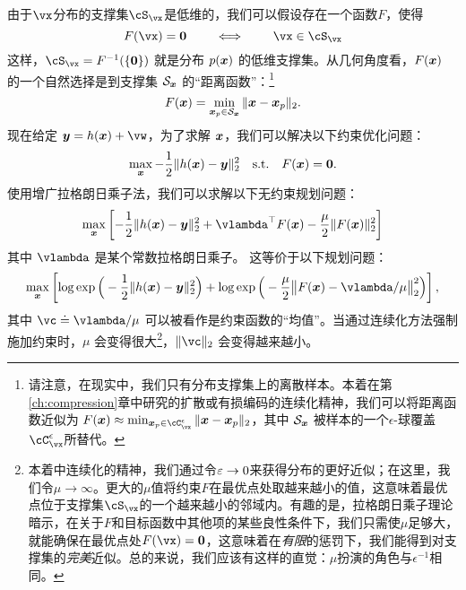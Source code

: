 \documentclass[../../book-main.tex]{subfiles}
\begin{document}
由于\(\vx\)分布的支撑集\(\cS_{\vx}\)是低维的，我们可以假设存在一个函数\(F\)，使得
\begin{equation}
  F(\vx) = \boldsymbol{0} \qquad \iff \qquad \vx \in \cS_{\vx}
\end{equation}
这样，\(\cS_{\vx} = F^{-1}(\{\vzero\})\) 就是分布 $p(\bm{x})$ 的低维支撑集。从几何角度看，$F(\bm{x})$ 的一个自然选择是到支撑集 $\mathcal{S}_{\bm{x}}$ 的“距离函数”：\footnote{请注意，在现实中，我们只有分布支撑集上的离散样本。本着在第\ref{ch:compression}章中研究的扩散或有损编码的连续化精神，我们可以将距离函数近似为 $    F(\x) \approx \min_{\x_p \in \cC_{\vx}^{\epsilon}} \|\x - \x_p\|_2$，其中 $\mathcal{S}_{\bm{x}}$ 被样本的一个$\epsilon$-球覆盖\(\cC_{\vx}^{\epsilon}\)所替代。}
\begin{equation}
    F(\bm{x}) = \min_{\bm{x}_p \in \mathcal{S}_{\bm{x}}} \|\bm{x} - \bm{x}_p\|_2. 
\end{equation}
现在给定 $\y = h(\x) +\vw$，为了求解 $\bm{x}$，我们可以解决以下约束优化问题：
\begin{equation}
    \max_{\bm{x}} - \frac{1}{2}\|h(\bm{x}) - \bm{y}\|_2^2 \quad \mbox{s.t.} \quad F(\bm{x}) = \boldsymbol{0}. 
\end{equation}
使用增广拉格朗日乘子法，我们可以求解以下无约束规划问题：
\begin{equation}
   \max_{\x} \left[-\frac{1}{2}\|h(\x) - \y\|_2^2  + \vlambda^{\top} F(\x) - \frac{\mu}{2} \|F(\x)\|_2^2\right]
\end{equation}
其中 $\vlambda$ 是某个常数拉格朗日乘子。
这等价于以下规划问题：
\begin{equation}\label{eq:lagrange_multiplier_continuation}
\max_{\x} \left[\log \exp\Big(- \frac{1}{2}\|h(\x) - \y\|_2^2\Big) + \log \exp\Big( - \frac{\mu}{2} \big\|F(\x) - \vlambda/\mu\big\|_2^2\Big)\right],
\end{equation} 
其中 $\vc \doteq {\vlambda}/{\mu}$ 可以被看作是约束函数的“均值”。当通过连续化方法强制施加约束时，$\mu$ 会变得很大\footnote{本着中连续化的精神，我们通过令\(\varepsilon \to 0\)来获得分布的更好近似；在这里，我们令\(\mu \to \infty\)。更大的\(\mu\)值将约束\(F\)在最优点处取越来越小的值，这意味着最优点位于支撑集\(\cS_{\vx}\)的一个越来越小的邻域内。有趣的是，拉格朗日乘子理论暗示，在关于\(F\)和目标函数中其他项的某些良性条件下，我们只需使\(\mu\)足够大，就能确保在最优点处\(F(\vx) = \vzero\)，这意味着在\textit{有限}的惩罚下，我们能得到对支撑集的\textit{完美}近似。总的来说，我们应该有这样的直觉：\(\mu\)扮演的角色与\(\epsilon^{-1}\)相同。}，$\|\vc\|_2$ 会变得越来越小。
\end{document}
